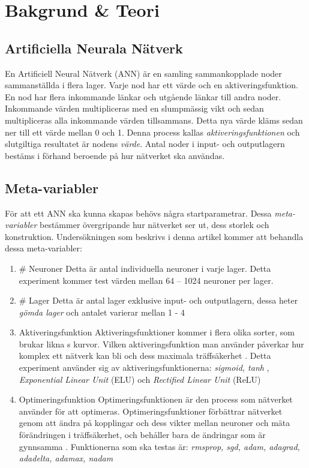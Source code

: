 \documentclass[a4paper, 11pt, twocolumn]{article}
\begin{document}
  \section{Bakgrund \& Teori}
    \subsection{Artificiella Neurala Nätverk}
    En Artificiell Neural Nätverk (ANN) är en samling sammankopplade noder sammanställda i flera lager. Varje nod har ett värde och en aktiveringsfunktion. En nod har flera inkommande länkar och utgående länkar till andra noder. Inkommande värden multipliceras med en slumpmässig vikt och sedan multipliceras alla inkommande värden tillsammans. Detta nya värde kläms sedan ner till ett värde mellan 0 och 1. Denna process kallas \textit{aktiveringsfunktionen} och slutgiltiga resultatet är nodens \textit{värde}. Antal noder i input- och outputlagern bestäms i förhand beroende på hur nätverket ska användas.

    \subsection{Meta-variabler}
    För att ett ANN ska kunna skapas behövs några startparametrar. Dessa \textit{meta-variabler} bestämmer övergripande hur nätverket ser ut, dess storlek och konstruktion. Undersökningen som beskrivs i denna artikel kommer att behandla dessa meta-variabler:
    \begin{enumerate}
      \item \# Neuroner
      Detta är antal individuella neuroner i varje lager. Detta experiment kommer test värden mellan 64 – 1024 neuroner per lager.
      \item \# Lager
      Detta är antal lager exklusive input- och outputlagern, dessa heter \textit{gömda lager} och antalet varierar mellan 1 - 4
      \item Aktiveringsfunktion
      Aktiveringsfunktioner kommer i flera olika sorter, som brukar likna s kurvor. Vilken aktiveringsfunktion man använder påverkar hur komplex ett nätverk kan bli och dess maximala träffsäkerhet \parencite{jain1996artificial}. Detta experiment använder sig av aktiveringsfunktionerna: \textit{sigmoid, tanh} \parencite{karlik2011performance}, \textit{Exponential Linear Unit} (ELU) \parencite{clevert2015fast} och \textit{Rectified Linear Unit} (ReLU) \parencite{xu2015empirical}
      \item Optimeringsfunktion
      Optimeringsfunktionen är den process som nätverket använder för att optimeras. Optimeringsfunktioner förbättrar nätverket genom att ändra på kopplingar och dess vikter mellan neuroner och mäta förändringen i träffsäkerhet, och behåller bara de ändringar som är gynnsamma \parencite{TypesofO34:online}. Funktionerna som ska testas är: \textit{rmsprop, sgd, adam, adagrad, adadelta, adamax, nadam} \parencite{kingma2014adam}
    \end{enumerate}
\end{document}
